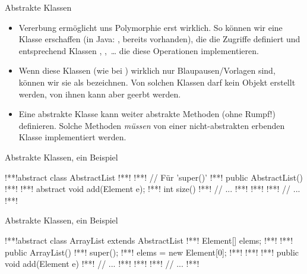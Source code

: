 \begin{frame}{Abstrakte Klassen}
    \begin{itemize}[<+(1)->]
        \widei
        \item Vererbung ermöglicht uns Polymorphie erst wirklich.\pause{} So können wir eine Klasse  erschaffen (in Java: , bereits vorhanden), die die Zugriffe definiert und entsprechend Klassen , ,~\ldots\pause{} die diese Operationen implementieren.
        \item Wenn diese Klassen (wie bei ) wirklich nur Blaupausen/Vorlagen sind,\pause{} können wir sie als  bezeichnen.\pause{} Von solchen Klassen darf kein Objekt erstellt werden,\pause{} von ihnen kann aber geerbt werden.
        \item Eine abstrakte Klasse kann weiter abstrakte Methoden (ohne Rumpf!) definieren.\pause{} Solche Methoden \emph{müssen} von einer nicht-abstrakten erbenden Klasse implementiert werden.
    \end{itemize}
\end{frame}

\begin{frame}[fragile,c]{Abstrakte Klassen, ein Beispiel}
\begin{plainjava}
!**!abstract class AbstractList {
!**!
!**!    // Für 'super()'
!**!    public AbstractList() { }
!**!
!**!    abstract void add(Element e);
!**!    int size() {
!**!        // ...
!**!    }
!**!
!**!    // ...
!**!}
\end{plainjava}
\end{frame}


\begin{frame}[fragile,c]{Abstrakte Klassen, ein Beispiel}
\begin{plainjava}
!**!abstract class ArrayList extends AbstractList {
!**!    Element[] elems;
!**!
!**!    public ArrayList() {
!**!        super();
!**!        elems = new Element[0];
!**!    }
!**!
!**!    public void add(Element e) {
!**!        // ...
!**!    }
!**!
!**!    // ...
!**!}
\end{plainjava}
\end{frame}


